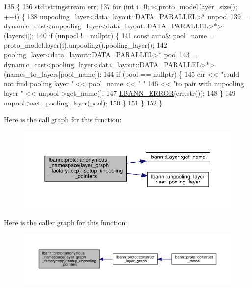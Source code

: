 \begin{DoxyCode}
135                                                                   \{
136   std::stringstream err;
137   \textcolor{keywordflow}{for} (\textcolor{keywordtype}{int} i=0; i<proto\_model.layer\_size(); ++i) \{
138     unpooling\_layer<data\_layout::DATA\_PARALLEL>* unpool
139       = \textcolor{keyword}{dynamic\_cast<}unpooling\_layer<data\_layout::DATA\_PARALLEL>*\textcolor{keyword}{>}(layers[i]);
140     \textcolor{keywordflow}{if} (unpool != \textcolor{keyword}{nullptr}) \{
141       \textcolor{keyword}{const} \textcolor{keyword}{auto}& pool\_name = proto\_model.layer(i).unpooling().pooling\_layer();
142       pooling\_layer<data\_layout::DATA\_PARALLEL>* pool
143         = \textcolor{keyword}{dynamic\_cast<}pooling\_layer<data\_layout::DATA\_PARALLEL>*\textcolor{keyword}{>}(names\_to\_layers[pool\_name]);
144       \textcolor{keywordflow}{if} (pool == \textcolor{keyword}{nullptr}) \{
145         err << \textcolor{stringliteral}{"could not find pooling layer "} << pool\_name << \textcolor{stringliteral}{" "}
146             << \textcolor{stringliteral}{"to pair with unpooling layer "} << unpool->get\_name();
147         \hyperlink{base_8hpp_a80b1d707117e968a6951b7222e4b2b87}{LBANN\_ERROR}(err.str());
148       \}
149       unpool->set\_pooling\_layer(pool);
150     \}
151   \}
152 \}
\end{DoxyCode}
Here is the call graph for this function\+:\nopagebreak
\begin{figure}[H]
\begin{center}
\leavevmode
\includegraphics[width=350pt]{namespacelbann_1_1proto_1_1anonymous__namespace_02layer__graph__factory_8cpp_03_a68f963a80592c01832cacf2acd4bacc1_cgraph}
\end{center}
\end{figure}
Here is the caller graph for this function\+:\nopagebreak
\begin{figure}[H]
\begin{center}
\leavevmode
\includegraphics[width=350pt]{namespacelbann_1_1proto_1_1anonymous__namespace_02layer__graph__factory_8cpp_03_a68f963a80592c01832cacf2acd4bacc1_icgraph}
\end{center}
\end{figure}
